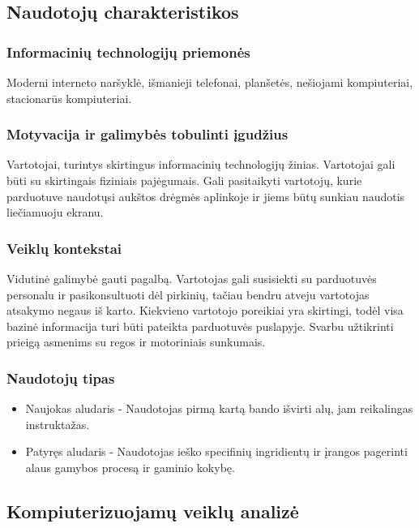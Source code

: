 \documentclass[oneside]{VUMIFPSkursinis}
\begin{document}
	\subsection{Naudotojų charakteristikos}
		\subsubsection{Informacinių technologijų priemonės}
			Moderni interneto naršyklė, išmanieji telefonai, planšetės, nešiojami kompiuteriai, stacionarūs kompiuteriai.
		\subsubsection{Motyvacija ir galimybės tobulinti įgudžius}
			 Vartotojai, turintys skirtingus informacinių technologijų žinias. Vartotojai gali būti su skirtingais fiziniais pajėgumais.
			Gali pasitaikyti vartotojų, kurie parduotuve naudotųsi aukštos drėgmės aplinkoje ir jiems būtų sunkiau naudotis liečiamuoju ekranu.
		\subsubsection{Veiklų kontekstai}
			Vidutinė galimybė gauti pagalbą.
			Vartotojas gali susisiekti su parduotuvės personalu ir pasikonsultuoti dėl pirkinių, tačiau bendru atveju vartotojas atsakymo negaus iš karto.
			Kiekvieno vartotojo poreikiai yra skirtingi, todėl visa bazinė informacija turi būti pateikta parduotuvės puslapyje.
			Svarbu užtikrinti prieigą asmenims su regos ir motoriniais sunkumais.
		\subsubsection{Naudotojų tipas}
			\begin{itemize}
				\item{Naujokas aludaris - Naudotojas pirmą kartą bando išvirti alų, jam reikalingas instruktažas.}
				\item{Patyręs aludaris - Naudotojas ieško specifinių ingridientų ir įrangos pagerinti alaus gamybos procesą ir gaminio kokybę.}
			\end{itemize}
	\subsection{Kompiuterizuojamų veiklų analizė}
\end{document}
